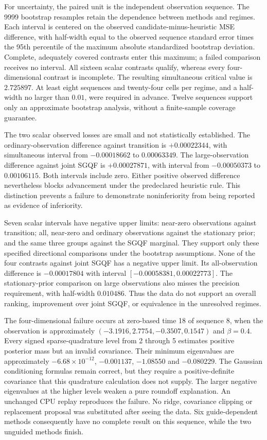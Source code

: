 \documentclass[11pt]{article}
\begin{document}
For uncertainty, the paired unit is the independent observation sequence.
The 9999 bootstrap resamples retain the dependence between methods and
regimes. Each interval is centered on the observed candidate-minus-heuristic
MSE difference, with half-width equal to the observed sequence standard error
times the 95th percentile of the maximum absolute standardized bootstrap
deviation. Complete, adequately covered contrasts enter this maximum; a
failed comparison receives no interval. All sixteen scalar contrasts qualify,
whereas every four-dimensional contrast is incomplete. The resulting
simultaneous critical value is $2.725897$. At least eight sequences and
twenty-four cells per regime, and a half-width no larger than $0.01$, were
required in advance. Twelve sequences support only an approximate bootstrap
analysis, without a finite-sample coverage guarantee.

The two scalar observed losses are small and not statistically established.
The ordinary-observation difference against transition is $+0.00022344$,
with simultaneous interval from $-0.00018662$ to $0.00063349$. The
large-observation difference against joint SGQF is $+0.00027871$, with
interval from $-0.00050373$ to $0.00106115$. Both intervals include zero. Either positive
observed difference nevertheless blocks advancement under the predeclared
heuristic rule. This distinction prevents a failure to demonstrate
noninferiority from being reported as evidence of inferiority.

Seven scalar intervals have negative upper limits: near-zero observations
against transition; all, near-zero and ordinary observations against the
stationary prior; and the same three groups against the SGQF marginal.
They support only these specified directional comparisons under the
bootstrap assumptions. None of the four contrasts against joint SGQF has a
negative upper limit. Its all-observation difference is $-0.00017804$ with
interval $[-0.00058381,0.00022773]$. The stationary-prior comparison on
large observations also misses the precision requirement, with half-width
$0.010486$. Thus the data do not support an overall ranking, improvement
over joint SGQF, or equivalence in the unresolved regimes.

The four-dimensional failure occurs at zero-based time 18 of sequence 8,
when the observation is approximately
$(-3.1916,2.7754,-0.3507,0.1547)$ and $\beta=0.4$. Every signed
sparse-quadrature level from 2 through 5 estimates positive posterior mass
but an invalid covariance. Their minimum eigenvalues are approximately
$-6.68\times10^{-12}$, $-0.001137$, $-1.08550$ and $-0.080229$.
The Gaussian conditioning formulas remain correct, but they require a
positive-definite covariance that this quadrature calculation does not
supply. The larger negative eigenvalues at the higher levels weaken a
pure roundoff explanation. An unchanged CPU replay reproduces the failure.
No ridge, covariance clipping or replacement proposal was substituted after
seeing the data. Six guide-dependent methods consequently have no complete
result on this sequence, while the two unguided methods finish.
\end{document}
